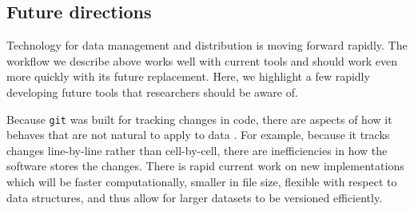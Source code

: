 \documentclass[a4paper,11pt]{article}
\begin{document}



\subsection{Future directions}

Technology for data management and distribution is moving forward rapidly.  The workflow we describe above works well with current tools and should work even more quickly with its future replacement.  Here, we highlight a few rapidly developing future tools that researchers should be aware of.

Because \texttt{git} was built for tracking changes in code, there are aspects of how it behaves that are not natural to apply to  data \cite{Perkel-2016}.  For example, because it tracks changes line-by-line rather than cell-by-cell, there are inefficiencies in how the software stores the changes.
There is rapid current work on new implementations which will be faster computationally, smaller in file size, flexible with respect to data structures, and thus allow for larger datasets to be versioned efficiently\citep{Fli, Dat}.
\end{document}
